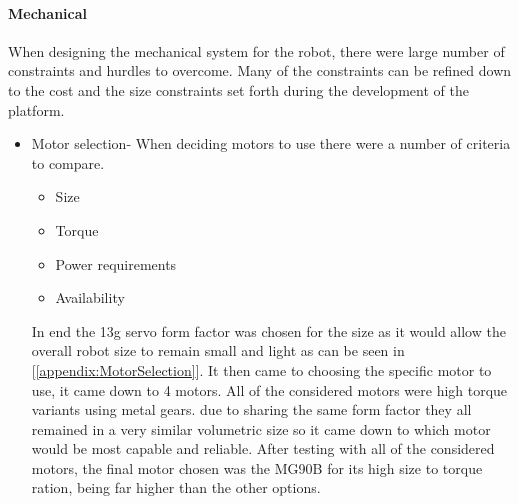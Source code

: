 \documentclass[conference]{IEEEtran}
\begin{document}
\paragraph*{Mechanical}
    When designing the mechanical system for the robot, there were large number of constraints and hurdles to overcome. Many of the constraints can be refined down to the cost and the size constraints set forth during the development of the platform. 
    \begin{itemize}
        \item Motor selection- 
            When deciding motors to use there were a number of criteria to compare. 
            \begin{itemize}
                \item Size
                \item Torque
                \item Power requirements
                \item Availability
            \end{itemize}
            In end the 13g servo form factor was chosen for the size as it would allow the overall robot size to remain small and light as can be seen in [\ref{appendix:MotorSelection}]. It then came to choosing the specific motor to use, it came down to 4 motors. All of the considered motors were high torque variants using metal gears. due to sharing the same form factor they all remained in a very similar volumetric size so it came down to which motor would be most capable and reliable. After testing with all of the considered motors, the final motor chosen was the MG90B for its high size to torque ration, being far higher than the other options.\newline
        

\end{itemize}
\end{document}
